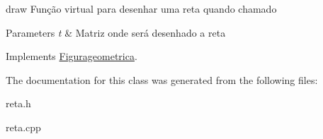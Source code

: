 draw Função virtual para desenhar uma reta quando chamado 


\begin{DoxyParams}{Parameters}
{\em t} & Matriz onde será desenhado a reta \\
\hline
\end{DoxyParams}


Implements \mbox{\hyperlink{class_figurageometrica_a68d9aba508879bb7a9ea1fe9d1d4f5f4}{Figurageometrica}}.



The documentation for this class was generated from the following files\+:\begin{DoxyCompactItemize}
\item 
reta.\+h\item 
reta.\+cpp\end{DoxyCompactItemize}
